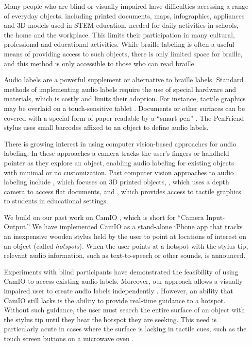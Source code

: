 \documentclass[runningheads]{res/templates/llncs}
\begin{document}
Many people who are blind or visually impaired have difficulties
accessing a range of everyday objects, including printed documents,
maps, infographics, appliances and 3D models used in STEM education,
needed for daily activities in schools, the home and the workplace. This
limits their participation in many cultural, professional and
educational activities. While braille labeling is often a useful means
of providing access to such objects, there is only limited space for
braille, and this method is only accessible to those who can read
braille.

Audio labels are a powerful supplement or alternative to braille labels.
Standard methods of implementing audio labels require the use of special
hardware and materials, which is costly and limits their adoption. For
instance, tactile graphics may be overlaid on a touch-sensitive tablet
\cite{TalkingTactileTablet}. Documents or other surfaces can be covered
with a special form of paper readable by a ``smart pen''
\cite{mieleTalkingTactileApps2010}. The PenFriend
\cite{kendrickPenFriendTouchMemo2011} stylus uses small barcodes affixed
to an object to define audio labels.

There is growing interest in using computer vision-based approaches for
audio labeling. In these approaches a camera tracks the user's fingers
or handheld pointer as they explore an object, enabling audio labeling
for existing objects with minimal or no customization. Past computer
vision approaches to audio labeling include
\cite{shiMarkitTalkitLowBarrier2017}, which focuses on 3D printed
objects, \cite{thevinAugmentedRealityPeople2018}, which uses a depth
camera to access flat documents, and
\cite{fuscoTactileGraphicsHelper2015}, which provides access to tactile
graphics to students in educational settings.

We build on our past work on CamIO
\cite{shenCamIO3DComputer2013,coughlanEvaluatingAuthorUser2017,coughlanTowardsAccessibleAudioLabeling2020},
which is short for ``Camera Input-Output.'' We have implemented CamIO as
a stand-alone iPhone app that tracks an inexpensive wooden stylus held
by the user to point at locations of interest on an object (called
{\em hotspots}). When the user points at a hotspot with the stylus tip,
relevant audio information, such as text-to-speech or other sounds, is
announced.

Experiments with blind participants have demonstrated the feasibility of using CamIO to access existing audio labels. 
Moreover, our approach allows a visually impaired user to create audio labels independently \cite{coughlanTowardsAccessibleAudioLabeling2020}. However, an ability that CamIO still lacks is the ability to provide real-time guidance to a hotspot. 
Without such guidance, the user must search the entire surface of an object with the stylus tip until they hear the hotspot they are seeking. 
This need is particularly acute in cases where the surface is lacking in tactile cues, such as the touch screen buttons on a microwave oven \cite{coughlanTowardsAccessibleAudioLabeling2020}.
\end{document}
